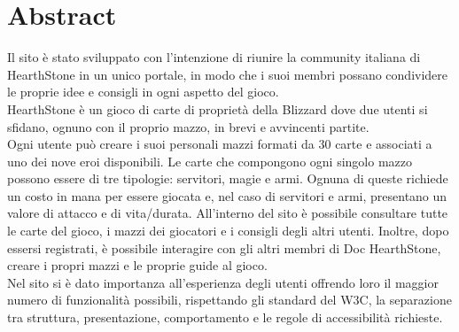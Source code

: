 \section{Abstract}
Il sito è stato sviluppato con l'intenzione di riunire la community italiana di HearthStone in un unico portale, in modo che i suoi membri possano condividere le proprie idee e consigli in ogni aspetto del gioco. \\
HearthStone è un gioco di carte di proprietà della Blizzard dove due utenti si sfidano, ognuno con il proprio mazzo, in brevi e avvincenti partite.\\
Ogni utente può creare i suoi personali mazzi formati da 30 carte e associati a uno dei nove eroi disponibili.
Le carte che compongono ogni singolo mazzo possono essere di tre tipologie: servitori, magie e armi. Ognuna di queste richiede un costo in mana per essere giocata e, nel caso di servitori e armi, presentano un valore di attacco e di vita/durata.
All'interno del sito è possibile consultare tutte le carte del gioco, i mazzi dei giocatori e i consigli degli altri utenti. Inoltre, dopo essersi registrati, è possibile interagire con gli altri membri di Doc HearthStone, creare i propri mazzi e le proprie guide al gioco.\\
Nel sito si è dato importanza all'esperienza degli utenti offrendo loro il maggior numero di funzionalità possibili, rispettando gli standard del W3C, la separazione tra struttura, presentazione, comportamento e le regole di accessibilità richieste.
\newpage